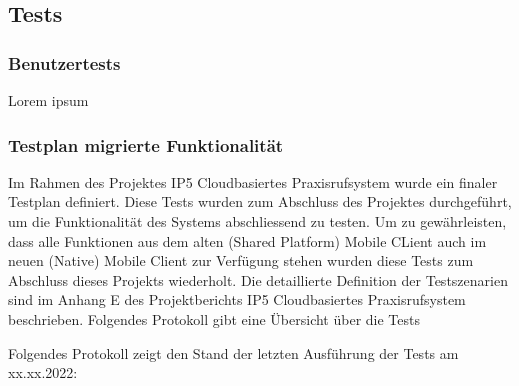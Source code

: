 \subsection{Tests}

\subsubsection{Benutzertests}

Lorem ipsum

\clearpage

\subsubsection{Testplan migrierte Funktionalität}

Im Rahmen des Projektes IP5 Cloudbasiertes Praxisrufsystem wurde ein finaler Testplan definiert.
Diese Tests wurden zum Abschluss des Projektes durchgeführt, um die Funktionalität des Systems abschliessend zu testen.
Um zu gewährleisten, dass alle Funktionen aus dem alten (Shared Platform) Mobile CLient auch im neuen (Native) Mobile Client zur Verfügung stehen wurden diese Tests zum Abschluss dieses Projekts wiederholt.
Die detaillierte Definition der Testszenarien sind im Anhang E des Projektberichts IP5 Cloudbasiertes Praxisrufsystem beschrieben.\cite{ip5}
Folgendes Protokoll gibt eine Übersicht über die Tests

Folgendes Protokoll zeigt den Stand der letzten Ausführung der Tests am xx.xx.2022:

